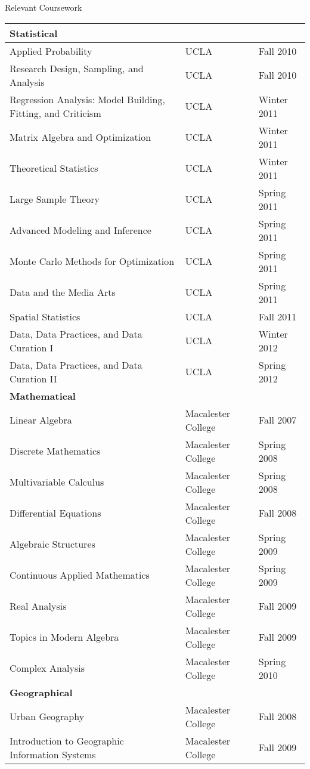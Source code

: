 \documentclass{resume} %
\begin{document}
\begin{rSection}{Relevant Coursework}
\begin{tabular}[c]{ lll}
\multicolumn{3}{l}{\bf Statistical} \rule{0pt}{4ex}\\
\hline
Applied Probability & UCLA & Fall 2010  \\
Research Design, Sampling, and Analysis & UCLA & Fall 2010  \\
Regression Analysis: Model Building, Fitting, and Criticism & UCLA & Winter 2011  \\
Matrix Algebra and Optimization & UCLA & Winter 2011 \\
Theoretical Statistics & UCLA & Winter 2011 \\
Large Sample Theory & UCLA & Spring 2011  \\
Advanced Modeling and Inference & UCLA & Spring 2011  \\
Monte Carlo Methods for Optimization & UCLA & Spring 2011  \\
Data and the Media Arts & UCLA & Spring 2011  \\
Spatial Statistics & UCLA & Fall 2011  \\
Data, Data Practices, and Data Curation I & UCLA & Winter 2012  \\
Data, Data Practices, and Data Curation II & UCLA & Spring 2012  \\
\multicolumn{3}{l}{\bf Mathematical} \rule{0pt}{4ex} \\
\hline
Linear Algebra & Macalester College & Fall 2007   \\
Discrete Mathematics & Macalester College & Spring 2008  \\
Multivariable Calculus & Macalester College & Spring 2008  \\
Differential Equations & Macalester College & Fall 2008 \\
Algebraic Structures & Macalester College & Spring 2009  \\
Continuous Applied Mathematics & Macalester College & Spring 2009  \\
Real Analysis & Macalester College & Fall 2009  \\
Topics in Modern Algebra & Macalester College & Fall 2009  \\
Complex Analysis & Macalester College & Spring 2010  \\
\multicolumn{3}{l}{\bf Geographical} \rule{0pt}{4ex}\\
\hline
Urban Geography & Macalester College & Fall 2008  \\
Introduction to Geographic Information Systems & Macalester College & Fall 2009 \\

\end{tabular}
\end{rSection}
\end{document}
